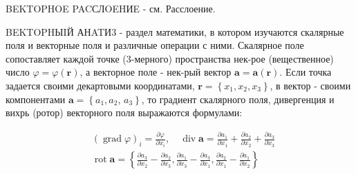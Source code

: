 \documentclass[10pt]{article}
\begin{document}
BEKTOPHOE PACСЛOEHИE - см. Расслоение.



BEKTOPHЫIЙ АНATИ3 - раздел математики, в котором изучаются скалярные поля и векторные поля и различные операции с ними. Скалярное поле сопоставляет каждой точке (3-мерного) пространства нек-рое (вещественное) число $\varphi=\varphi(\boldsymbol{r})$, а векторное поле - нек-рый вектор $\boldsymbol{a}=\boldsymbol{a}(\boldsymbol{r})$. Если точка задается своими декартовыми координатами, $\boldsymbol{r}=\left\{x_{1}, x_{2}, x_{3}\right\}$, в вектор - своими компонентами $\boldsymbol{a}=\left\{a_{1}, a_{2}\right.$, $\left.a_{3}\right\}$, то градиент скалярного поля, дивергенция и вихрь (ротор) векторного поля выражаются формулами:



\[

\begin{aligned}

& (\operatorname{grad} \varphi)_{i}=\frac{\partial \varphi}{\partial x_{i}}, \quad \operatorname{div} \boldsymbol{a}=\frac{\partial a_{1}}{\partial x_{1}}+\frac{\partial a_{2}}{\partial x_{2}}+\frac{\partial a_{3}}{\partial x_{3}} \\

& \operatorname{rot} \boldsymbol{a}=\left\{\frac{\partial a_{3}}{\partial x_{2}}-\frac{\partial a_{2}}{\partial x_{3}}, \frac{\partial a_{1}}{\partial x_{3}}-\frac{\partial a_{3}}{\partial x_{1}}, \frac{\partial a_{2}}{\partial x_{1}}-\frac{\partial a_{1}}{\partial x_{2}}\right\}

\end{aligned}

\]
\end{document}
